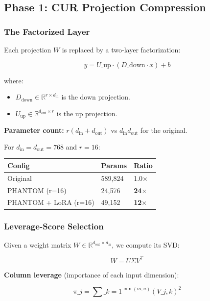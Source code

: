 \subsection{Phase 1: CUR Projection Compression}

\subsubsection{The Factorized Layer}

Each projection $W$ is replaced by a two-layer factorization:

\[
y = U\_\text{up} \cdot (D\_\text{down} \cdot x) + b
\tag{4.1}
\]

where:
\begin{itemize}
\item $D_\text{down} \in \mathbb{R}^{r \times d_\text{in}}$ is the down projection.
\item $U_\text{up} \in \mathbb{R}^{d_\text{out} \times r}$ is the up projection.

\end{itemize}
\textbf{Parameter count:} $r(d_\text{in} + d_\text{out})$ vs $d_\text{in} d_\text{out}$ 
for the original.

For $d_\text{in} = d_\text{out} = 768$ and $r = 16$:

\begin{table}[H]
\centering
\small
\begin{tabular}{lll}
\toprule
\textbf{Config} & \textbf{Params} & \textbf{Ratio} \\
\midrule
Original & 589,824 & 1.0$\times$ \\
PHANTOM (r=16) & 24,576 & \textbf{24$\times$} \\
PHANTOM + LoRA (r=16) & 49,152 & \textbf{12$\times$} \\
\bottomrule
\end{tabular}
\end{table}

\subsubsection{Leverage-Score Selection}

Given a weight matrix $W \in \mathbb{R}^{d_\text{out} \times d_\text{in}}$, 
we compute its SVD:

\[
W = U \Sigma V^\top
\tag{4.2}
\]

\textbf{Column leverage} (importance of each input dimension):

\[
\pi\_j = \sum\_{k=1}^{\min(m, n)} (V\_{j, k})^2
\tag{4.3}
\]

